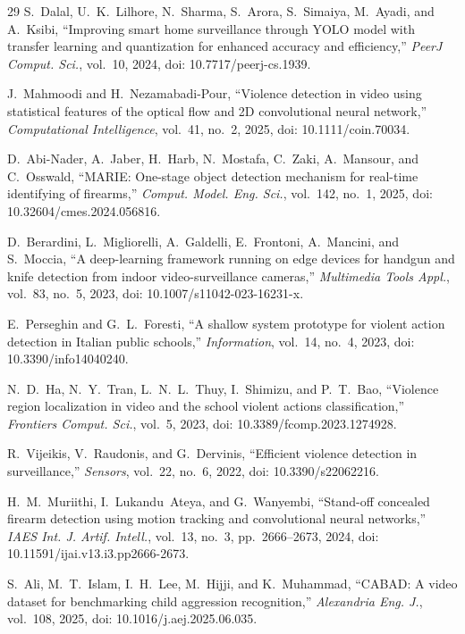 \documentclass[conference]{IEEEtran}
\begin{document}
\begin{thebibliography}{29}
 S.~Dalal, U.~K.~Lilhore, N.~Sharma, S.~Arora, S.~Simaiya, M.~Ayadi, and A.~Ksibi, ``Improving smart home surveillance through YOLO model with transfer learning and quantization for enhanced accuracy and efficiency,'' \textit{PeerJ Comput. Sci.}, vol.~10, 2024, doi: 10.7717/peerj-cs.1939.

 J.~Mahmoodi and H.~Nezamabadi-Pour, ``Violence detection in video using statistical features of the optical flow and 2D convolutional neural network,'' \textit{Computational Intelligence}, vol.~41, no.~2, 2025, doi: 10.1111/coin.70034.

 D.~Abi-Nader, A.~Jaber, H.~Harb, N.~Mostafa, C.~Zaki, A.~Mansour, and C.~Osswald, ``MARIE: One-stage object detection mechanism for real-time identifying of firearms,'' \textit{Comput. Model. Eng. Sci.}, vol.~142, no.~1, 2025, doi: 10.32604/cmes.2024.056816.

 D.~Berardini, L.~Migliorelli, A.~Galdelli, E.~Frontoni, A.~Mancini, and S.~Moccia, ``A deep-learning framework running on edge devices for handgun and knife detection from indoor video-surveillance cameras,'' \textit{Multimedia Tools Appl.}, vol.~83, no.~5, 2023, doi: 10.1007/s11042-023-16231-x.

 E.~Perseghin and G.~L.~Foresti, ``A shallow system prototype for violent action detection in Italian public schools,'' \textit{Information}, vol.~14, no.~4, 2023, doi: 10.3390/info14040240.

 N.~D.~Ha, N.~Y.~Tran, L.~N.~L.~Thuy, I.~Shimizu, and P.~T.~Bao, ``Violence region localization in video and the school violent actions classification,'' \textit{Frontiers Comput. Sci.}, vol.~5, 2023, doi: 10.3389/fcomp.2023.1274928.

 R.~Vijeikis, V.~Raudonis, and G.~Dervinis, ``Efficient violence detection in surveillance,'' \textit{Sensors}, vol.~22, no.~6, 2022, doi: 10.3390/s22062216.

 H.~M.~Muriithi, I.~Lukandu~Ateya, and G.~Wanyembi, ``Stand-off concealed firearm detection using motion tracking and convolutional neural networks,'' \textit{IAES Int. J. Artif. Intell.}, vol.~13, no.~3, pp.~2666--2673, 2024, doi: 10.11591/ijai.v13.i3.pp2666-2673.

 S.~Ali, M.~T.~Islam, I.~H.~Lee, M.~Hijji, and K.~Muhammad, ``CABAD: A video dataset for benchmarking child aggression recognition,'' \textit{Alexandria Eng. J.}, vol.~108, 2025, doi: 10.1016/j.aej.2025.06.035.


\end{thebibliography}
\end{document}
